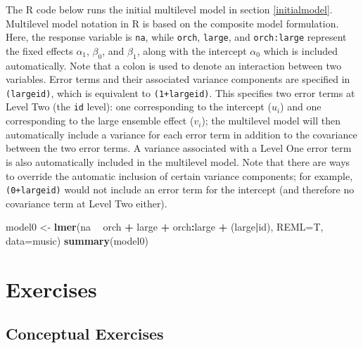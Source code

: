 \documentclass[
]{krantz}
\newenvironment{Shaded}{\begin{snugshade}}{\end{snugshade}}
\newcommand{\DataTypeTok}[1]{\textcolor[rgb]{0.27,0.27,0.27}{#1}}
\newcommand{\KeywordTok}[1]{\textcolor[rgb]{0.27,0.27,0.27}{\textbf{#1}}}
\newcommand{\NormalTok}[1]{#1}
\newcommand{\OperatorTok}[1]{\textcolor[rgb]{0.43,0.43,0.43}{\textbf{#1}}}
\newcommand{\StringTok}[1]{\textcolor[rgb]{0.5,0.5,0.5}{#1}}
\begin{document}
The R code below runs the initial multilevel model in section \ref{initialmodel}. Multilevel model notation in R is based on the composite model formulation. Here, the response variable is \texttt{na}, while \texttt{orch}, \texttt{large}, and \texttt{orch:large} represent the fixed effects \(\alpha_{1}\), \(\beta_{0}\), and \(\beta_{1}\), along with the intercept \(\alpha_{0}\) which is included automatically. Note that a colon is used to denote an interaction between two variables. Error terms and their associated variance components are specified in \texttt{(large\textbar{}id)}, which is equivalent to \texttt{(1+large\textbar{}id)}. This specifies two error terms at Level Two (the \texttt{id} level): one corresponding to the intercept (\(u_{i}\)) and one corresponding to the large ensemble effect (\(v_{i}\)); the multilevel model will then automatically include a variance for each error term in addition to the covariance between the two error terms. A variance associated with a Level One error term is also automatically included in the multilevel model. Note that there are ways to override the automatic inclusion of certain variance components; for example, \texttt{(0+large\textbar{}id)} would not include an error term for the intercept (and therefore no covariance term at Level Two either).

\begin{Shaded}
\begin{Highlighting}[]
\NormalTok{model0 <-}\StringTok{ }\KeywordTok{lmer}\NormalTok{(na }\OperatorTok{~}\StringTok{ }\NormalTok{orch }\OperatorTok{+}\StringTok{ }\NormalTok{large }\OperatorTok{+}\StringTok{ }\NormalTok{orch}\OperatorTok{:}\NormalTok{large }\OperatorTok{+}
\StringTok{  }\NormalTok{(large}\OperatorTok{|}\NormalTok{id), }\DataTypeTok{REML=}\NormalTok{T, }\DataTypeTok{data=}\NormalTok{music)}
\KeywordTok{summary}\NormalTok{(model0)}
\end{Highlighting}
\end{Shaded}

\hypertarget{exercises-7}{%
\section{Exercises}\label{exercises-7}}

\hypertarget{conceptual-exercises-5}{%
\subsection{Conceptual Exercises}\label{conceptual-exercises-5}}
\end{document}
